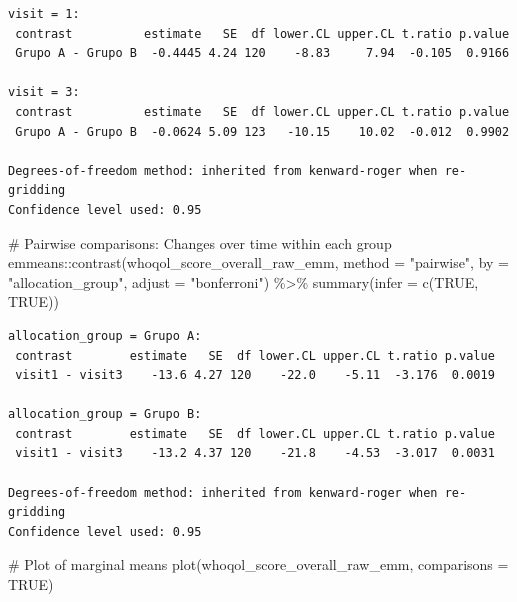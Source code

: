 \documentclass[
  letterpaper,
  DIV=11,
  numbers=noendperiod]{scrartcl}
\newenvironment{Shaded}{\begin{snugshade}}{\end{snugshade}}
\newcommand{\AttributeTok}[1]{\textcolor[rgb]{0.40,0.45,0.13}{#1}}
\newcommand{\CommentTok}[1]{\textcolor[rgb]{0.37,0.37,0.37}{#1}}
\newcommand{\ConstantTok}[1]{\textcolor[rgb]{0.56,0.35,0.01}{#1}}
\newcommand{\FunctionTok}[1]{\textcolor[rgb]{0.28,0.35,0.67}{#1}}
\newcommand{\NormalTok}[1]{\textcolor[rgb]{0.00,0.23,0.31}{#1}}
\newcommand{\SpecialCharTok}[1]{\textcolor[rgb]{0.37,0.37,0.37}{#1}}
\newcommand{\StringTok}[1]{\textcolor[rgb]{0.13,0.47,0.30}{#1}}
\begin{document}
\begin{verbatim}
visit = 1:
 contrast          estimate   SE  df lower.CL upper.CL t.ratio p.value
 Grupo A - Grupo B  -0.4445 4.24 120    -8.83     7.94  -0.105  0.9166

visit = 3:
 contrast          estimate   SE  df lower.CL upper.CL t.ratio p.value
 Grupo A - Grupo B  -0.0624 5.09 123   -10.15    10.02  -0.012  0.9902

Degrees-of-freedom method: inherited from kenward-roger when re-gridding 
Confidence level used: 0.95 
\end{verbatim}

\begin{Shaded}
\begin{Highlighting}[]
\CommentTok{\# Pairwise comparisons: Changes over time within each group}
\NormalTok{emmeans}\SpecialCharTok{::}\FunctionTok{contrast}\NormalTok{(whoqol\_score\_overall\_raw\_emm, }\AttributeTok{method =} \StringTok{"pairwise"}\NormalTok{, }\AttributeTok{by =} \StringTok{"allocation\_group"}\NormalTok{, }\AttributeTok{adjust =} \StringTok{"bonferroni"}\NormalTok{) }\SpecialCharTok{\%\textgreater{}\%} \FunctionTok{summary}\NormalTok{(}\AttributeTok{infer =} \FunctionTok{c}\NormalTok{(}\ConstantTok{TRUE}\NormalTok{, }\ConstantTok{TRUE}\NormalTok{))}
\end{Highlighting}
\end{Shaded}

\begin{verbatim}
allocation_group = Grupo A:
 contrast        estimate   SE  df lower.CL upper.CL t.ratio p.value
 visit1 - visit3    -13.6 4.27 120    -22.0    -5.11  -3.176  0.0019

allocation_group = Grupo B:
 contrast        estimate   SE  df lower.CL upper.CL t.ratio p.value
 visit1 - visit3    -13.2 4.37 120    -21.8    -4.53  -3.017  0.0031

Degrees-of-freedom method: inherited from kenward-roger when re-gridding 
Confidence level used: 0.95 
\end{verbatim}

\begin{Shaded}
\begin{Highlighting}[]
\CommentTok{\# Plot of marginal means}
\FunctionTok{plot}\NormalTok{(whoqol\_score\_overall\_raw\_emm, }\AttributeTok{comparisons =} \ConstantTok{TRUE}\NormalTok{)}
\end{Highlighting}
\end{Shaded}
\end{document}
